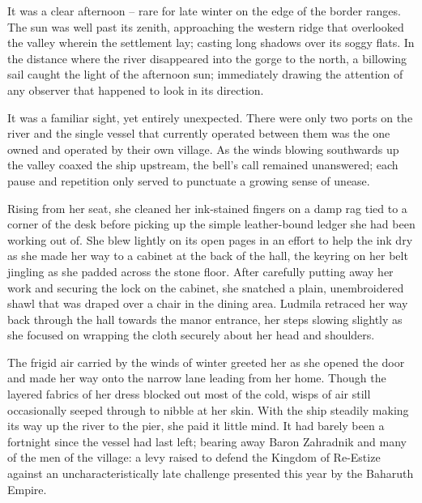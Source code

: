  

It was a clear afternoon – rare for late winter on the edge of the border ranges. The sun was well past its zenith, approaching the western ridge that overlooked the valley wherein the settlement lay; casting long shadows over its soggy flats. In the distance where the river disappeared into the gorge to the north, a billowing sail caught the light of the afternoon sun; immediately drawing the attention of any observer that happened to look in its direction.

 

It was a familiar sight, yet entirely unexpected. There were only two ports on the river and the single vessel that currently operated between them was the one owned and operated by their own village. As the winds blowing southwards up the valley coaxed the ship upstream, the bell’s call remained unanswered; each pause and repetition only served to punctuate a growing sense of unease.

 

Rising from her seat, she cleaned her ink-stained fingers on a damp rag tied to a corner of the desk before picking up the simple leather-bound ledger she had been working out of. She blew lightly on its open pages in an effort to help the ink dry as she made her way to a cabinet at the back of the hall, the keyring on her belt jingling as she padded across the stone floor. After carefully putting away her work and securing the lock on the cabinet, she snatched a plain, unembroidered shawl that was draped over a chair in the dining area. Ludmila retraced her way back through the hall towards the manor entrance, her steps slowing slightly as she focused on wrapping the cloth securely about her head and shoulders.

 

The frigid air carried by the winds of winter greeted her as she opened the door and made her way onto the narrow lane leading from her home. Though the layered fabrics of her dress blocked out most of the cold, wisps of air still occasionally seeped through to nibble at her skin. With the ship steadily making its way up the river to the pier, she paid it little mind. It had barely been a fortnight since the vessel had last left; bearing away Baron Zahradnik and many of the men of the village: a levy raised to defend the Kingdom of Re-Estize against an uncharacteristically late challenge presented this year by the Baharuth Empire.

 

